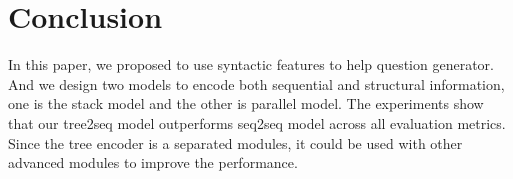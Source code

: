 \section{Conclusion}
In this paper, we proposed to use syntactic features to help question generator. And we design two models to encode both sequential and structural information, one is the stack model and the other is parallel model. The experiments show that our tree2seq model outperforms seq2seq model across all evaluation metrics. Since the tree encoder is a separated modules, it could be used with other advanced modules to improve the performance.